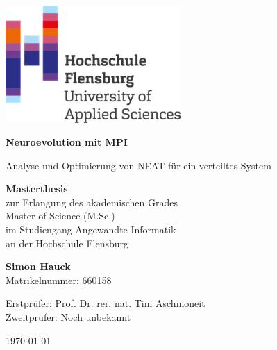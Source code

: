 \documentclass[12pt,a4paper]{scrreprt}
\begin{document}
\begin{titlepage}
	\begin{center}
		\includegraphics[width=0.50\textwidth]{img/hs_logo.png}\par\vspace{0cm}
		\vspace{1.5cm}
		{\huge\bfseries Neuroevolution mit MPI \par}
		\vspace{0.5cm}
		{\LARGE Analyse und Optimierung von NEAT für ein verteiltes System\par}
		\vspace{2cm}
	\end{center}

	\begin{large}
		\noindent
		\textbf{Masterthesis}\\
		zur Erlangung des akademischen Grades\\
		Master of Science (M.Sc.)\\
		im Studiengang Angewandte Informatik\\
		an der Hochschule Flensburg
		\vspace{1cm}
	\end{large}
	
	\begin{large}
		\noindent
		\textbf{Simon Hauck}\\
		Matrikelnummer: 660158
		\vspace{1.0cm}
	\end{large}
	
	\begin{large}
		\noindent
		Erstprüfer: \hspace{1.0cm} Prof. Dr. rer. nat. Tim Aschmoneit \\
		Zweitprüfer: \hspace{0.7cm} Noch unbekannt\\
	\end{large}
	\vspace{1.5cm}

	{\large \centering \today\par}
\end{titlepage}
\end{document}
